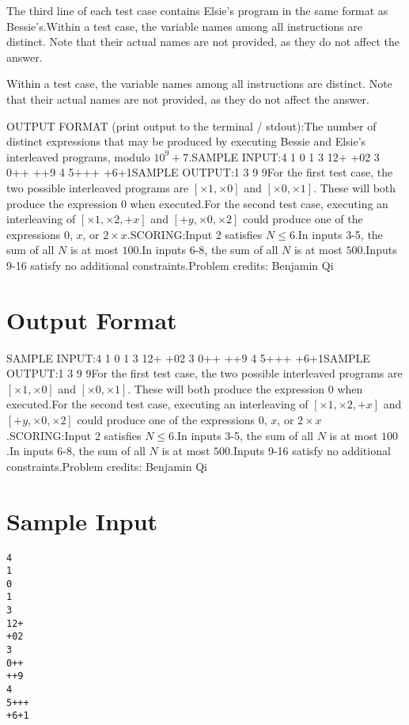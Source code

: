 \documentclass[12pt]{article}
\begin{document}
The third line of each test case contains Elsie's program in the same format as
Bessie's.Within a test case, the variable names among all instructions are distinct. Note
that their actual names are not provided, as they do not affect the answer.

Within a test case, the variable names among all instructions are distinct. Note
that their actual names are not provided, as they do not affect the answer.

OUTPUT FORMAT (print output to the terminal / stdout):The number of distinct expressions that may be produced by executing  Bessie and
Elsie's interleaved programs, modulo $10^9+7$.SAMPLE INPUT:4
1
0
1
3
12+
+02
3
0++
++9
4
5+++
+6+1SAMPLE OUTPUT:1
3
9
9For the first test case, the two possible interleaved programs are
$[\times 1, \times 0]$  and $[\times 0,\times 1]$. These will both produce the
expression $0$ when executed.For the second test case, executing an interleaving of $[\times 1,\times 2, +x]$
and $[+y, \times 0,\times 2]$ could produce one of the expressions $0$, $x$, or
$2\times x$.SCORING:Input 2 satisfies $N\le 6$.In inputs 3-5, the sum of all $N$ is at most $100$.In inputs 6-8, the sum of all $N$ is at most $500$.Inputs 9-16 satisfy no additional constraints.Problem credits: Benjamin Qi

\section*{Output Format}
SAMPLE INPUT:4
1
0
1
3
12+
+02
3
0++
++9
4
5+++
+6+1SAMPLE OUTPUT:1
3
9
9For the first test case, the two possible interleaved programs are
$[\times 1, \times 0]$  and $[\times 0,\times 1]$. These will both produce the
expression $0$ when executed.For the second test case, executing an interleaving of $[\times 1,\times 2, +x]$
and $[+y, \times 0,\times 2]$ could produce one of the expressions $0$, $x$, or
$2\times x$.SCORING:Input 2 satisfies $N\le 6$.In inputs 3-5, the sum of all $N$ is at most $100$.In inputs 6-8, the sum of all $N$ is at most $500$.Inputs 9-16 satisfy no additional constraints.Problem credits: Benjamin Qi

\section*{Sample Input}
\begin{verbatim}
4
1
0
1
3
12+
+02
3
0++
++9
4
5+++
+6+1
\end{verbatim}
\end{document}
